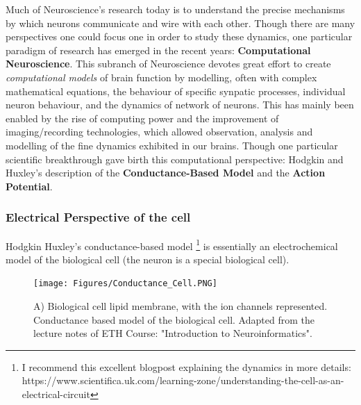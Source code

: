 Much of Neuroscience's research today is to understand the precise mechanisms by which neurons communicate and wire with each other. Though there are many perspectives one could focus one in order to study these dynamics, one particular paradigm of research has emerged in the recent years: \textbf{Computational Neuroscience}. This subranch of Neuroscience devotes great effort to create \textit{computational models} of brain function by modelling, often with complex mathematical equations, the behaviour of specific synpatic processes, individual neuron behaviour, and the dynamics of network of neurons. This has mainly been enabled by the rise of computing power and the improvement of imaging/recording technologies, which allowed observation, analysis and modelling of the fine dynamics exhibited in our brains. Though one particular scientific breakthrough gave birth this computational perspective: Hodgkin and Huxley's description of the \textbf{Conductance-Based Model} and the \textbf{Action Potential}.

\subsubsection{Electrical Perspective of the cell}

Hodgkin Huxley's conductance-based model \footnote{I recommend this excellent blogpost explaining the dynamics in more details: https://www.scientifica.uk.com/learning-zone/understanding-the-cell-as-an-electrical-circuit} is essentially an electrochemical model of the biological cell (the neuron is a special biological cell). 

\begin{figure}
    \centering
    \texttt{[image: Figures/Conductance\_Cell.PNG]}
    \caption{A) Biological cell lipid membrane, with the ion channels represented. Conductance based model of the biological cell. Adapted from the lecture notes of ETH Course: "Introduction to Neuroinformatics".}
    \label{fig:Conductance_Cell}
\end{figure}

